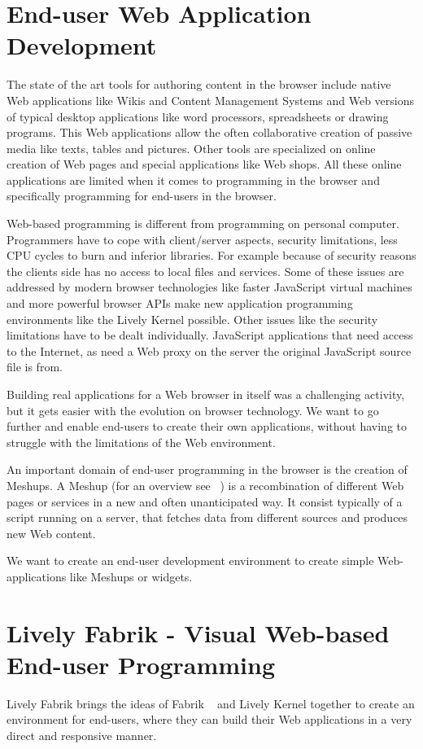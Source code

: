 \documentclass[pdftex, times, 10pt, twocolumn]{article}
\begin{document}
\section{End-user Web Application Development}
The state of the art tools for authoring content in the browser include native Web applications like Wikis and Content Management Systems and Web versions of typical desktop applications like word processors, spreadsheets or drawing programs. This Web applications allow the often collaborative creation of passive media like texts, tables and pictures. Other tools are specialized on online creation of Web pages and special applications like Web shops. All these online applications are limited when it comes to programming in the browser and specifically programming for end-users in the browser. 

Web-based programming is different from programming on personal computer. Programmers have to cope with client/server aspects, security limitations, less CPU cycles to burn and inferior libraries. For example because of  security reasons the clients side has no access to local files and services.  Some of these issues are addressed by modern browser technologies like faster JavaScript virtual machines and more powerful browser APIs make new application programming environments like the Lively Kernel possible. Other issues like the security limitations have to be dealt individually. JavaScript applications that need access to the Internet, as need a Web proxy on the server the original JavaScript source file is from.   

Building real applications for a Web browser in itself was a challenging activity, but it gets easier with the evolution on browser technology. We want to go further and enable end-users to create their own applications, without having to struggle with the limitations of the Web environment. 

An important domain of end-user programming in the browser is the creation of Meshups.  A Meshup (for an overview see ~\cite{Merrill2006MNB}) is a recombination of different Web pages or services in a new and often unanticipated way. It consist typically of a script running on a server, that fetches data from different sources and produces new Web content.  

We want to create an end-user development environment to create simple Web-applications like Meshups or widgets.   



\section{Lively Fabrik - Visual Web-based End-user Programming}
Lively Fabrik brings the ideas of Fabrik ~\cite{Ingalls1988FVP,Ludolph1988FPE} and Lively Kernel together to create an environment for end-users, where they can build their Web applications in a very direct and responsive manner.  
\end{document}

